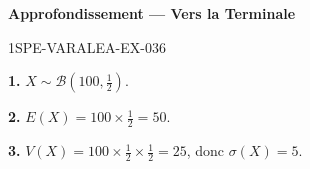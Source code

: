 \begin{center}\textbf{Approfondissement — Vers la Terminale}\end{center}
\begin{corrige}{1SPE-VARALEA-EX-036}

\textbf{1.} $X \sim \mathcal{B}(100, \frac{1}{2})$.

\textbf{2.} $E(X) = 100 \times \frac{1}{2} = 50$.

\textbf{3.} $V(X) = 100 \times \frac{1}{2} \times \frac{1}{2} = 25$, donc $\sigma(X) = 5$.

\end{corrige}
